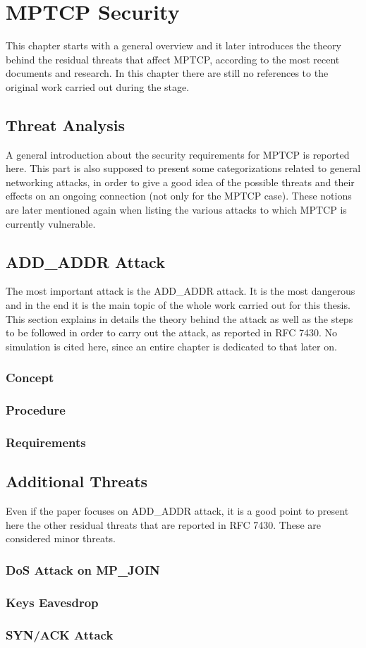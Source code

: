 \chapter{MPTCP Security}
\label{chap:mptcpsecurity}

This chapter starts with a general overview and it later introduces the theory behind the residual threats that affect MPTCP, according to the most recent documents and research. In this chapter there are still no references to the original work carried out during the stage.

\section{Threat Analysis}
A general introduction about the security requirements for MPTCP is reported here. This part is also supposed to present some categorizations related to general networking attacks, in order to give a good idea of the possible threats and their effects on an ongoing connection (not only for the MPTCP case). These notions are later mentioned again when listing the various attacks to which MPTCP is currently vulnerable.

\section{ADD\_ADDR Attack} \label{theaddaddrattack}
The most important attack is the ADD\_ADDR attack. It is the most dangerous and in the end it is the main topic of the whole work carried out for this thesis. This section explains in details the theory behind the attack as well as the steps to be followed in order to carry out the attack, as reported in RFC 7430. No simulation is cited here, since an entire chapter is dedicated to that later on.

\subsection{Concept}
\subsection{Procedure}
\subsection{Requirements}


\section{Additional Threats}
Even if the paper focuses on ADD\_ADDR attack, it is a good point to present here the other residual threats that are reported in RFC 7430. These are considered minor threats.

\subsection{DoS Attack on MP\_JOIN}
\subsection{Keys Eavesdrop}
\subsection{SYN/ACK Attack}